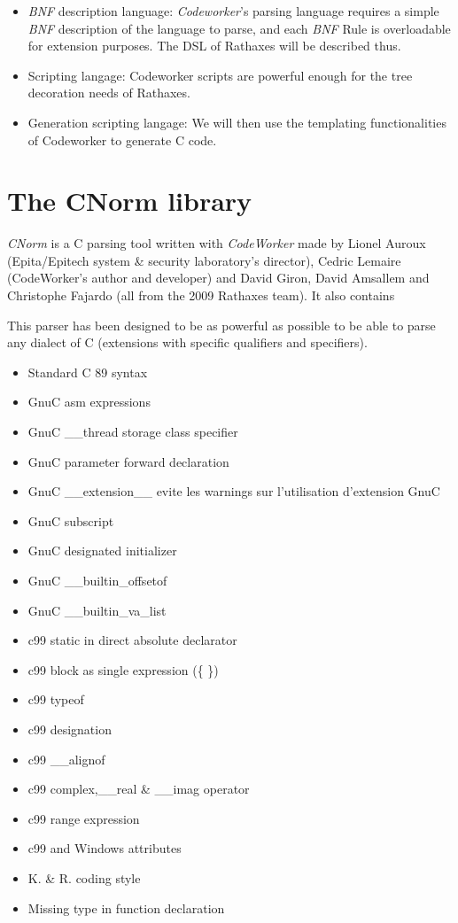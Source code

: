 \documentclass{rtxreport}
\begin{document}
\begin{itemize}
    \item \emph{BNF} description language: \emph{Codeworker}'s parsing language
        requires a simple \emph{BNF} description of the language to parse, and
        each \emph{BNF} Rule is overloadable for extension purposes. The DSL of
        Rathaxes will be described thus.
    \item Scripting langage: Codeworker scripts are
        powerful enough for the tree decoration needs of Rathaxes.
    \item Generation scripting langage: We will then use the templating
        functionalities of Codeworker to generate C code.
\end{itemize}



\section{The CNorm library}

\emph{CNorm} is a C parsing tool written with \emph{CodeWorker} made by Lionel
Auroux (Epita/Epitech system \& security laboratory's director), Cedric Lemaire
(CodeWorker's author and developer) and David Giron, David Amsallem and
Christophe Fajardo (all from the 2009 Rathaxes team). It also contains

This parser has been designed to be as powerful as possible to be able to
parse any dialect of C (extensions with specific qualifiers and specifiers).

\begin{itemize}
    \item Standard C 89 syntax
    \item GnuC asm expressions
    \item GnuC \_\_thread storage class specifier
    \item GnuC parameter forward declaration
    \item GnuC \_\_extension\_\_ evite les warnings sur l'utilisation
    d'extension GnuC
    \item GnuC subscript
    \item GnuC designated initializer
    \item GnuC \_\_builtin\_offsetof
    \item GnuC \_\_builtin\_va\_list
    \item c99 static in direct absolute declarator
    \item c99 block as single expression (\{ \})
    \item c99 typeof
    \item c99 designation
    \item c99 \_\_alignof
    \item c99 complex,\_\_real \& \_\_imag operator
    \item c99 range expression
    \item c99 and Windows attributes
    \item K. \& R. coding style
    \item Missing type in function declaration
\end{itemize}
\end{document}
